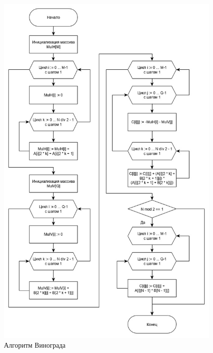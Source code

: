 \documentclass[12pt, a4paper]{report}
\begin{document}
	\begin{figure}[ht!]
		\centering
		\includegraphics[scale=0.6]{vin.jpg}
		\caption{Алгоритм Винограда}
		\label{fig:vin}
	\end{figure}
\end{document}
